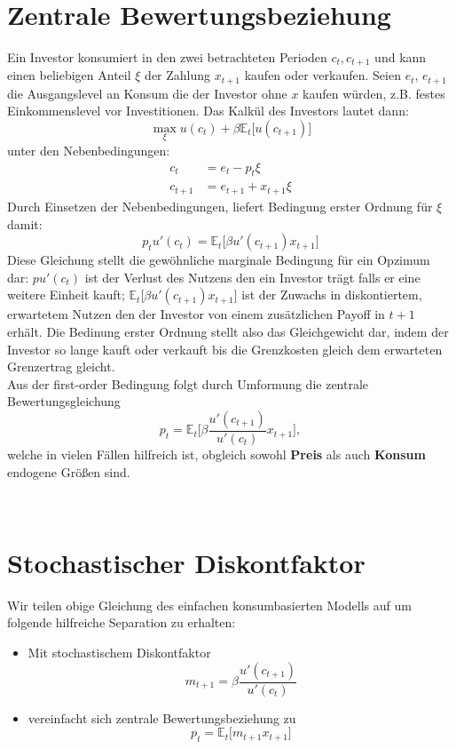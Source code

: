 \documentclass[12pt]{extreport} %
\theoremstyle{named}
\theoremstyle{nnamed}
\theoremstyle{itshape}
\theoremstyle{normal}
\begin{document}
~\newpage

\section{Zentrale Bewertungsbeziehung}

Ein Investor konsumiert in den zwei betrachteten Perioden $c_t, c_{t+1}$ und kann einen beliebigen Anteil $\xi$ der Zahlung $x_{t+1}$ kaufen oder verkaufen. Seien $e_t$, $e_{t+1}$ die Ausgangslevel an Konsum die der Investor ohne $x$ kaufen würden, z.B. festes Einkommenslevel vor Investitionen. Das Kalkül des Investors lautet dann:
		$$ \max_{\xi} u(c_t) + \beta \mathbb{E}_t \big[ u(c_{t+1}) \big] $$
	unter den Nebenbedingungen: 
		\begin{align*}
			c_{t} & = e_t - p_t \xi \\
			c_{t+1} & = e_{t+1} + x_{t+1} \xi
		\end{align*}
Durch Einsetzen der Nebenbedingungen, liefert Bedingung erster Ordnung für $\xi$ damit:
	$$ p_t u'(c_t) = \mathbb{E}_t \big[ \beta u'(c_{t+1}) x_{t+1} \big] $$
Diese Gleichung stellt die gewöhnliche marginale Bedingung für ein Opzimum dar: $p u'(c_t)$ ist der Verlust des Nutzens den ein Investor trägt falls er eine weitere Einheit kauft; $\mathbb{E}_t \big[ \beta u'(c_{t+1}) x_{t+1} \big]$ ist der Zuwachs in diskontiertem, erwartetem Nutzen den der Investor von einem zusätzlichen Payoff in $t+1$ erhält. Die Bedinung erster Ordnung stellt also das Gleichgewicht dar, indem der Investor so lange kauft oder verkauft bis die Grenzkosten  gleich dem erwarteten Grenzertrag gleicht. ~\\

Aus der first-order Bedingung folgt durch Umformung die zentrale Bewertungsgleichung
	$$ p_t = \mathbb{E}_t \big[ \beta \frac{u'(c_{t+1})}{u'(c_t)} x_{t+1} \big], $$
welche in vielen Fällen hilfreich ist, obgleich sowohl \textbf{Preis} als auch \textbf{Konsum} endogene Größen sind. 

~\newpage

\section{Stochastischer Diskontfaktor}

Wir teilen obige Gleichung des einfachen konsumbasierten Modells auf um folgende hilfreiche Separation zu erhalten:

\begin{itemize}
	\item Mit stochastischem Diskontfaktor
	 $$ m_{t+1} = \beta \frac{u'(c_{t+1})}{u'(c_t)} $$
	\item vereinfacht sich zentrale Bewertungsbeziehung zu
	 $$ p_t = \mathbb{E}_t \big[ m_{t+1} x_{t+1} \big] $$
\end{itemize}
\end{document}
